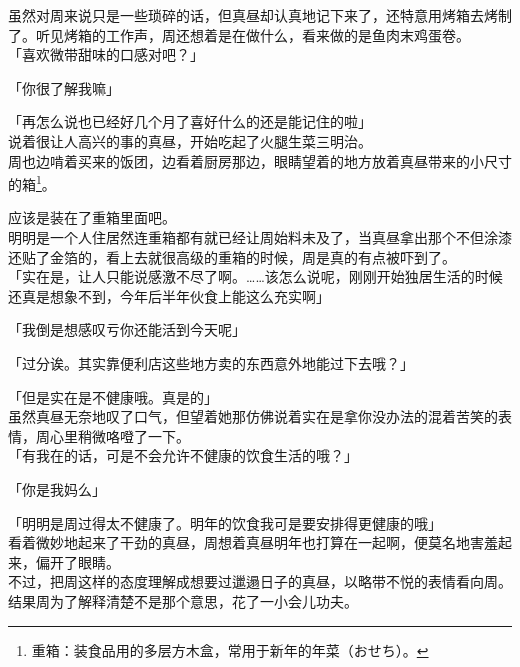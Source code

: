 虽然对周来说只是一些琐碎的话，但真昼却认真地记下来了，还特意用烤箱去烤制了。听见烤箱的工作声，周还想着是在做什么，看来做的是鱼肉末鸡蛋卷。\\

「喜欢微带甜味的口感对吧？」

「你很了解我嘛」

「再怎么说也已经好几个月了喜好什么的还是能记住的啦」\\

说着很让人高兴的事的真昼，开始吃起了火腿生菜三明治。\\

周也边啃着买来的饭团，边看着厨房那边，眼睛望着的地方放着真昼带来的小尺寸的箱\footnote{重箱：装食品用的多层方木盒，常用于新年的年菜（{\jpfont おせち}）。}。

应该是装在了重箱里面吧。\\

明明是一个人住居然连重箱都有就已经让周始料未及了，当真昼拿出那个不但涂漆还贴了金箔的，看上去就很高级的重箱的时候，周是真的有点被吓到了。\\

「实在是，让人只能说感激不尽了啊。……该怎么说呢，刚刚开始独居生活的时候还真是想象不到，今年后半年伙食上能这么充实啊」

「我倒是想感叹亏你还能活到今天呢」

「过分诶。其实靠便利店这些地方卖的东西意外地能过下去哦？」

「但是实在是不健康哦。真是的」\\

虽然真昼无奈地叹了口气，但望着她那仿佛说着实在是拿你没办法的混着苦笑的表情，周心里稍微咯噔了一下。\\

「有我在的话，可是不会允许不健康的饮食生活的哦？」

「你是我妈么」

「明明是周过得太不健康了。明年的饮食我可是要安排得更健康的哦」\\

看着微妙地起来了干劲的真昼，周想着真昼明年也打算在一起啊，便莫名地害羞起来，偏开了眼睛。\\

不过，把周这样的态度理解成想要过邋遢日子的真昼，以略带不悦的表情看向周。结果周为了解释清楚不是那个意思，花了一小会儿功夫。
